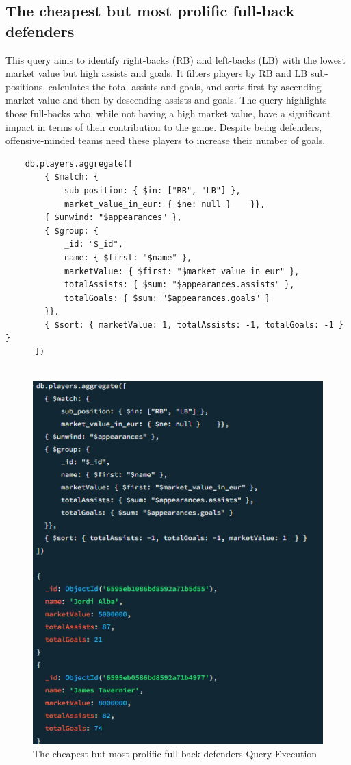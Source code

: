 \documentclass{Configuration_Files/PoliMi3i_thesis}
\begin{document}
\subsection{The cheapest but most prolific full-back defenders}
This query aims to identify right-backs (RB) and left-backs (LB) with the lowest market value but high assists and goals. It filters players by RB and LB sub-positions, calculates the total assists and goals, and sorts first by ascending market value and then by descending assists and goals. The query highlights those full-backs who, while not having a high market value, have a significant impact in terms of their contribution to the game. Despite being defenders, offensive-minded teams need these players to increase their number of goals.

\begin{verbatim}
    db.players.aggregate([
        { $match: { 
            sub_position: { $in: ["RB", "LB"] },
            market_value_in_eur: { $ne: null }    }},
        { $unwind: "$appearances" },
        { $group: { 
            _id: "$_id", 
            name: { $first: "$name" },
            marketValue: { $first: "$market_value_in_eur" },
            totalAssists: { $sum: "$appearances.assists" },
            totalGoals: { $sum: "$appearances.goals" }
        }},
        { $sort: { marketValue: 1, totalAssists: -1, totalGoals: -1 } }
      ])
      
\end{verbatim}
\begin{figure}[htbp]
    \centering
    \includegraphics[scale=0.8]{Images/Queries/Cheapest_prolific_full_backs/cpfb.png}
    \caption{The cheapest but most prolific full-back defenders Query Execution}
\end{figure}
\end{document}
